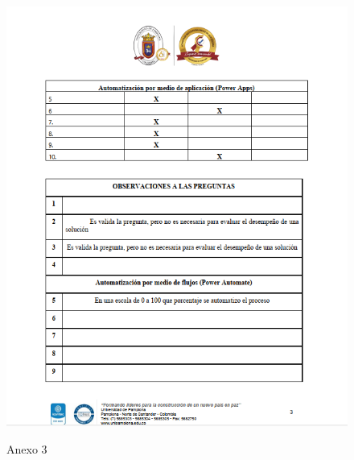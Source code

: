 \begin{figure}[H]
	\centering
	\includegraphics[scale=0.4]{Capitulo6/3}
	\label{anexo3}
	\caption{Anexo 3}
\end{figure}

